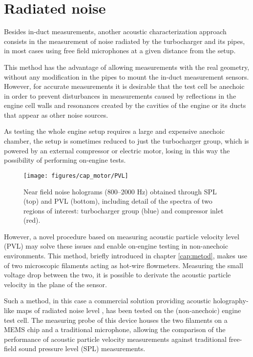 \section{Radiated noise}
\label{sub:radiated_noise_measurement}

Besides in-duct measurements, another acoustic characterization approach consists in the measurement of noise radiated by the turbocharger and its pipes, in most cases using free field microphones at a given distance from the setup.

This method has the advantage of allowing measurements with the real geometry, without any modification in the pipes to mount the in-duct measurement sensors. However, for accurate measurements it is desirable that the test cell be anechoic in order to prevent disturbances in measurements caused by reflections in the engine cell walls and resonances created by the cavities of the engine or its ducts that appear as other noise sources.

As testing the whole engine setup requires a large and expensive anechoic chamber, the setup is sometimes reduced to just the turbocharger group, which is powered by an external compressor or electric motor, losing in this way the possibility of performing on-engine tests.

\begin{figure}[b!]
\centering
\texttt{[image: figures/cap\_motor/PVL]}
\caption{Near field noise holograms (800--2000 Hz) obtained through SPL (top) and PVL (bottom), including detail of the spectra of two regions of interest: turbocharger group (blue) and compressor inlet (red).}
\label{fig:PVL}
\end{figure}

However, a novel procedure based on measuring acoustic particle velocity level (PVL) may solve these issues \cite{jacobsen2005comp} and enable on-engine testing in non-anechoic environments. This method, briefly introduced in chapter \ref{cap:metod}, makes use of two microscopic filaments acting as hot-wire flowmeters. Measuring the small voltage drop between the two, it is possible to derivate the acoustic particle velocity in the plane of the sensor.

Such a method, in this case a commercial solution providing acoustic holography-like maps of radiated noise level \cite{comesana2013scan}, has been tested on the (non-anechoic) engine test cell. The measuring probe of this device houses the two filaments on a MEMS chip and a traditional microphone, allowing the comparison of the performance of acoustic particle velocity measurements against traditional free-field sound pressure level (SPL) measurements.

